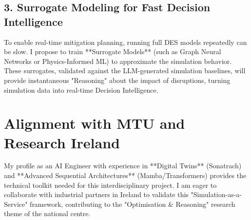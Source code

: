 \documentclass[11pt,a4paper]{article}
\begin{document}
\subsection{3. Surrogate Modeling for Fast Decision Intelligence}
To enable real-time mitigation planning, running full DES models repeatedly can be slow. I propose to train **Surrogate Models** (such as Graph Neural Networks or Physics-Informed ML) to approximate the simulation behavior. These surrogates, validated against the LLM-generated simulation baselines, will provide instantaneous "Reasoning" about the impact of disruptions, turning simulation data into real-time Decision Intelligence.

\section{Alignment with MTU and Research Ireland}
My profile as an AI Engineer with experience in **Digital Twins** (Sonatrach) and **Advanced Sequential Architectures** (Mamba/Transformers) provides the technical toolkit needed for this interdisciplinary project. I am eager to collaborate with industrial partners in Ireland to validate this "Simulation-as-a-Service" framework, contributing to the "Optimisation \& Reasoning" research theme of the national centre.
\end{document}
